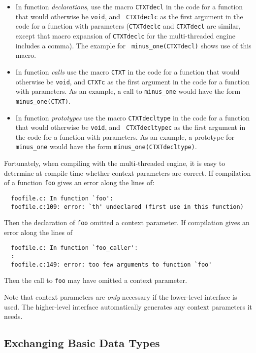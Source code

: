 \begin{itemize}
\item In function {\em declarations}, use the macro {\tt CTXTdecl} in
  the code for a function that would otherwise be {\tt void}, and {\tt
    CTXTdeclc} as the first argument in the code for a function with
  parameters ({\tt CTXTdeclc} and {\tt CTXTdecl} are similar, except
  that macro expansion of {\tt CTXTdeclc} for the multi-threaded
  engine includes a comma).  The example for {\tt
    minus\_one(CTXTdecl)} shows use of this macro.

\item In function {\em calls} use the macro {\tt CTXT} in the code for
  a function that would otherwise be {\tt void}, and {\tt CTXTc} as
  the first argument in the code for a function with parameters.  As
  an example, a call to {\tt minus\_one} would have the form {\tt
    minus\_one(CTXT)}.

\item In function {\em prototypes} use the macro {\tt CTXTdecltype} in
  the code for a function that would otherwise be {\tt void}, and {\tt
    CTXTdecltypec} as the first argument in the code for a function
  with parameters.  As an example, a prototype for {\tt minus\_one}
  would have the form {\tt minus\_one(CTXTdecltype)}.

\end{itemize}

Fortunately, when compiling with the multi-threaded engine, it is easy
to determine at compile time whether context parameters are correct.
If compilation of a function {\tt foo} gives an error along the lines
of:
%
\begin{verbatim} 
  foofile.c: In function `foo':
  foofile.c:109: error: `th' undeclared (first use in this function)
\end{verbatim}
%
Then the declaration of {\tt foo} omitted a context parameter.  If
compilation gives an error along the lines of 
%
\begin{verbatim} 
  foofile.c: In function `foo_caller':
  :
  foofile.c:149: error: too few arguments to function `foo'
\end{verbatim}
Then the call to {\tt foo} may have omitted a context parameter.

Note that context parameters are {\em only} necessary if the
lower-level interface is used.  The higher-level interface
automatically generates any context parameters it needs.

\subsection{Exchanging Basic Data Types}

